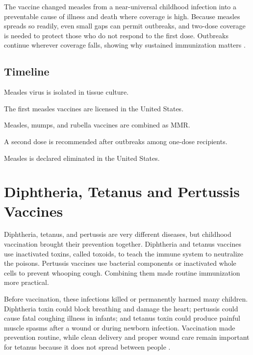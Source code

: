 \documentclass[12pt,oneside]{book}
\begin{document}
The vaccine changed measles from a near-universal childhood infection into a
preventable cause of illness and death where coverage is high. Because measles
spreads so readily, even small gaps can permit outbreaks, and two-dose
coverage is needed to protect those who do not respond to the first dose.
Outbreaks continue wherever coverage falls, showing why sustained immunization
matters \cite{cdcMeaslesPinkBook,cdcMeaslesHistory}.

\section*{Timeline}
\begin{description}[leftmargin=2.3cm,style=nextline]
  \item[1954] Measles virus is isolated in tissue culture.
  \item[1963] The first measles vaccines are licensed in the United States.
  \item[1971] Measles, mumps, and rubella vaccines are combined as MMR.
  \item[1989] A second dose is recommended after outbreaks among one-dose recipients.
  \item[2000] Measles is declared eliminated in the United States.
\end{description}
\chapter[Diphtheria, Tetanus and Pertussis Vaccines]{Diphtheria, Tetanus and Pertussis Vaccines}

Diphtheria, tetanus, and pertussis are very different diseases, but childhood
vaccination brought their prevention together. Diphtheria and tetanus vaccines
use inactivated toxins, called toxoids, to teach the immune system to
neutralize the poisons. Pertussis vaccines use bacterial components or
inactivated whole cells to prevent whooping cough. Combining them made routine
immunization more practical.

Before vaccination, these infections killed or permanently harmed many
children. Diphtheria toxin could block breathing and damage the heart;
pertussis could cause fatal coughing illness in infants; and tetanus toxin
could produce painful muscle spasms after a wound or during newborn infection.
Vaccination made prevention routine, while clean delivery and proper wound
care remain important for tetanus because it does not spread between people
\cite{cdcDTPHistory,cdcDTPRecommendations}.
\end{document}
